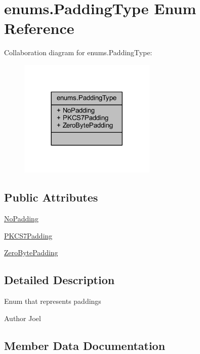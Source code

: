\hypertarget{enumenums_1_1_padding_type}{}\section{enums.\+Padding\+Type Enum Reference}
\label{enumenums_1_1_padding_type}


Collaboration diagram for enums.\+Padding\+Type\+:\nopagebreak
\begin{figure}[H]
\begin{center}
\leavevmode
\includegraphics[width=185pt]{enumenums_1_1_padding_type__coll__graph}
\end{center}
\end{figure}
\subsection*{Public Attributes}
\begin{DoxyCompactItemize}
\item 
\mbox{\hyperlink{enumenums_1_1_padding_type_aa30542d418f4018515766006344efce7}{No\+Padding}}
\item 
\mbox{\hyperlink{enumenums_1_1_padding_type_ad7fb7874fc6bb5a4285057cc5ee60d4d}{P\+K\+C\+S7\+Padding}}
\item 
\mbox{\hyperlink{enumenums_1_1_padding_type_ace14d0c57287f28ddf135f760da602b4}{Zero\+Byte\+Padding}}
\end{DoxyCompactItemize}


\subsection{Detailed Description}
Enum that represents paddings \begin{DoxyAuthor}{Author}
Joel 
\end{DoxyAuthor}


\subsection{Member Data Documentation}
\mbox{\label{enumenums_1_1_padding_type_aa30542d418f4018515766006344efce7}} 
